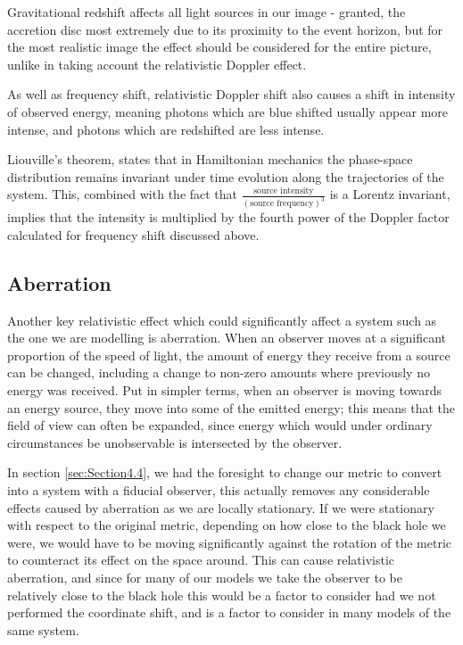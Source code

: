 \documentclass[oneside,openright,frontopenright, singlespacing]{dmathesis}
\begin{document}
\vspace{1em}
	Gravitational redshift affects all light sources in our image - granted, the accretion disc most extremely due to its proximity to the event horizon, but for the most realistic image the effect should be considered for the entire picture, unlike in taking account the relativistic Doppler effect.

\vspace{1em}
	As well as frequency shift, relativistic Doppler shift also causes a shift in intensity of observed energy, meaning photons which are blue shifted usually appear more intense, and photons which are redshifted are less intense.

\vspace{1em}
	Liouville's theorem\cite{Liouville1838}, states that in Hamiltonian mechanics the phase-space distribution remains invariant under time evolution along the trajectories of the system. This, combined with the fact that $\frac{\mbox{source intensity}}{(\mbox{source frequency})^3}$ is a Lorentz invariant\cite{johnson1982intensity}, implies that the intensity is multiplied by the fourth power of the Doppler factor calculated for frequency shift discussed above.

\subsection{Aberration}\label{subsec:Subsection5.2.3}

	Another key relativistic effect which could significantly affect a system such as the one we are modelling is aberration. When an observer moves at a significant proportion of the speed of light, the amount of energy they receive from a source can be changed, including a change to non-zero amounts where previously no energy was received. Put in simpler terms, when an observer is moving towards an energy source, they move into some of the emitted energy; this means that the field of view can often be expanded, since energy which would under ordinary circumstances be unobservable is intersected by the observer.

\vspace{1em}
	In section \ref{sec:Section4.4}, we had the foresight to change our metric to convert into a system with a fiducial observer, this actually removes any considerable effects caused by aberration as we are locally stationary. If we were stationary with respect to the original metric, depending on how close to the black hole we were, we would have to be moving significantly against the rotation of the metric to counteract its effect on the space around. This can cause relativistic aberration, and since for many of our models we take the observer to be relatively close to the black hole this would be a factor to consider had we not performed the coordinate shift, and is a factor to consider in many models of the same system.
\end{document}
